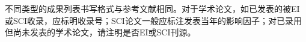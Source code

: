 
\begin{accomplishments}
    不同类型的成果列表书写格式与参考文献相同。对于学术论文，如已发表的被EI或SCI收录，应标明收录号；SCI论文一般应标注发表当年的影响因子；对已录用但尚未发表的学术论文，请注明是否EI或SCI刊源。
\end{accomplishments}